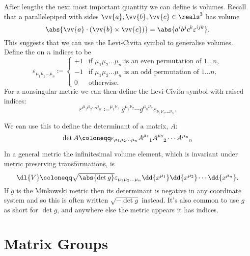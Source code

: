 \documentclass[fleqn]{NotesClass}
\begin{document}
    After lengths the next most important quantity we can define is volumes.
    Recall that a parallelepiped with sides \(\vv{a}, \vv{b}, \vv{c} \in \reals^3\) has volume
    \begin{equation}
        \abs{\vv{a} \cdot (\vv{b} \times \vv{c})} = \abs{a^ib^jc^k\varepsilon^{ijk}}.
    \end{equation}
    This suggests that we can use the Levi-Civita symbol to generalise volumes.
    Define the  on \(n\) indices to be
    \begin{equation}
        \varepsilon_{\mu_1 \mu_2 \dots \mu_n} \coloneqq
        \begin{cases}
            +1 & \text{if } \mu_1 \mu_2 \dots \mu_n \text{ is an even permutation of } 1 \dots n,\\
            -1 & \text{if } \mu_1 \mu_2 \dots \mu_n \text{ is an odd permutation of } 1 \dots n,\\
            0 & \text{otherwise}.
        \end{cases}
    \end{equation}
    For a nonsingular metric we can then define the Levi-Civita symbol with raised indices:
    \begin{equation}
        \varepsilon^{\mu_1\mu_2 \dots \mu_n} \coloneqq ^{\mu_1\nu_1}g^{\mu_2\nu_2} \dotsm g^{\mu_n\nu_n} \varepsilon_{\nu_1\nu_2 \dots \nu_n}.
    \end{equation}
    
    We can use this to define the determinant of a matrix, \(A\):
    \begin{equation}
        \det A \coloneqq \varepsilon_{\mu_1\mu_2 \dots \mu_n} \tensor{A}{^{\mu_1}_1} \tensor{A}{^{\mu_2}_2} \dotsm \tensor{A}{^{\mu_n}_n}
    \end{equation}
    
    In a general metric the infinitesimal volume element, which is invariant under metric preserving transformations, is
    \begin{equation}
        \dl{V} \coloneqq \sqrt{\abs{\det g}} \varepsilon_{\mu_1\mu_2 \dots \mu_n} \dd{x^{\mu_1}} \dd{x^{\mu_2}} \dotsm \dd{x^{\mu_n}}.
    \end{equation}	
    If \(g\) is the Minkowski metric then its determinant is negative in any coordinate system and so this is often written \(\sqrt{-\det g}\) instead.
    It's also common to use \(g\) as short for \(\det g\), and anywhere else the metric appears it has indices.
    
    \chapter{Matrix Groups}
\end{document}
